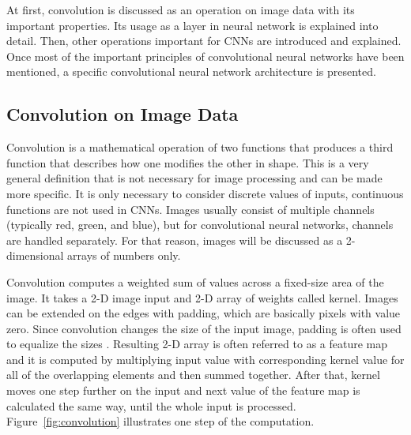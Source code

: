 At first, convolution is discussed as an operation on image data with its important properties. Its usage as a layer in neural network is explained into detail. Then, other operations important for CNNs are introduced and explained. Once most of the important principles of convolutional neural networks have been mentioned, a specific convolutional neural network architecture is presented.

\subsection{\label{sec:conv-on-image}Convolution on Image Data}

Convolution is a mathematical operation of two functions that produces a third function that describes how one modifies the other in shape. This is a very general definition that is not necessary for image processing and can be made more specific. It is only necessary to consider discrete values of inputs, continuous functions are not used in CNNs. Images usually consist of multiple channels (typically red, green, and blue), but for convolutional neural networks, channels are handled separately. For that reason, images will be discussed as a 2-dimensional arrays of numbers only.

Convolution computes a weighted sum of values across a fixed-size area of the image. It takes a 2-D image input and 2-D array of weights called kernel. Images can be extended on the edges with padding, which are basically pixels with value zero. Since convolution changes the size of the input image, padding is often used to equalize the sizes \cite{dumoulin2016guide}. Resulting 2-D array is often referred to as a feature map and it is computed by multiplying input value with corresponding kernel value for all of the overlapping elements and then summed together. After that, kernel moves one step further on the input and next value of the feature map is calculated the same way, until the whole input is processed. Figure~\ref{fig:convolution} illustrates one step of the computation.

